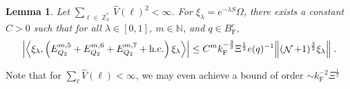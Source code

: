 \documentclass[12pt,a4paper]{article}
\numberwithin{equation}{section}
\newcommand{\NNN}{\mathbb{N}}
\newcommand{\1}{\mathbb{I}}
\newcommand{\F}{\mathrm{F}}
\DeclareMathOperator{\Z}{\mathbb{Z}}
\DeclareMathOperator{\NN}{\mathcal{N}}
\newcommand{\half}{\frac{1}{2}}
\newcommand{\eva}[1]{\left\langle #1 \right\rangle}
\theoremstyle{plain}
\newtheorem{lemma}[theorem]{Lemma}
\theoremstyle{definition}
\theoremstyle{remark}
\theoremstyle{plain}
\theoremstyle{definition}
\theoremstyle{remark}
\begin{document}
\begin{lemma} \label{lem:EQ213}
Let $ \sum_{\ell \in \Z_3^*} \hat{V}(\ell)^2 < \infty $. For $\xi_\lambda = e^{-\lambda S} \Omega$, there exists a constant $ C > 0 $ such that for all $ \lambda \in [0,1] $, $ m \in \NNN $, and $ q \in B_{\F}^c $,
\begin{equation}
\begin{aligned}
	\abs{\eva{\xi_\lambda,\left(E^{m,5}_{Q_2}+E^{m,6}_{Q_2}+E^{m,7}_{Q_2}+\mathrm{h.c.}\right) \xi_\lambda }}
	\leq C^m k_{\F}^{-\frac 32} \Xi^{\half} e(q)^{-1}
		\norm { (\NN+1)^{\frac 32} \xi_\lambda } \;. \label{eq:estEQ213}
\end{aligned}
\end{equation}
\end{lemma}

\textcolor{green!30!black}{Note that for $ \sum_\ell \hat{V}(\ell) < \infty $, we may even achieve a bound of order $ \sim k_{\F}^{-2} \Xi^\half $}
\end{document}
